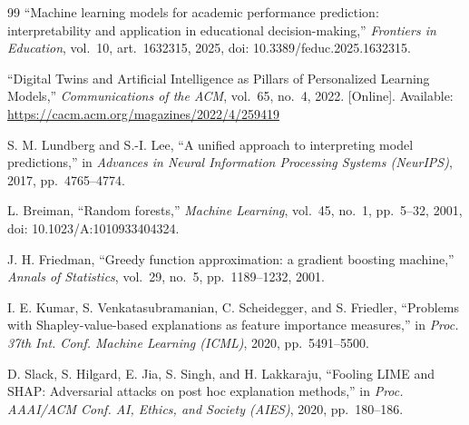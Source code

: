 \documentclass[conference]{IEEEtran}
\begin{document}
\begin{thebibliography}{99}
 ``Machine learning models for academic performance
prediction: interpretability and application in educational decision-making,''
\emph{Frontiers in Education}, vol.~10, art.~1632315, 2025,
doi: 10.3389/feduc.2025.1632315.

 ``Digital Twins and Artificial Intelligence as Pillars of
Personalized Learning Models,'' \emph{Communications of the ACM}, vol.~65, no.~4,
2022. [Online]. Available:
\url{https://cacm.acm.org/magazines/2022/4/259419}

 S. M. Lundberg and S.-I. Lee, ``A unified approach to
interpreting model predictions,'' in \emph{Advances in Neural Information
Processing Systems (NeurIPS)}, 2017, pp.~4765--4774.

 L. Breiman, ``Random forests,'' \emph{Machine Learning},
vol.~45, no.~1, pp.~5--32, 2001, doi: 10.1023/A:1010933404324.

 J. H. Friedman, ``Greedy function approximation: a
gradient boosting machine,'' \emph{Annals of Statistics}, vol.~29, no.~5,
pp.~1189--1232, 2001.

 I. E. Kumar, S. Venkatasubramanian, C. Scheidegger, and
S. Friedler, ``Problems with Shapley-value-based explanations as feature
importance measures,'' in \emph{Proc. 37th Int. Conf. Machine Learning (ICML)},
2020, pp.~5491--5500.

 D. Slack, S. Hilgard, E. Jia, S. Singh, and H. Lakkaraju,
``Fooling LIME and SHAP: Adversarial attacks on post hoc explanation methods,''
in \emph{Proc. AAAI/ACM Conf. AI, Ethics, and Society (AIES)}, 2020,
pp.~180--186.
\end{thebibliography}
\end{document}
